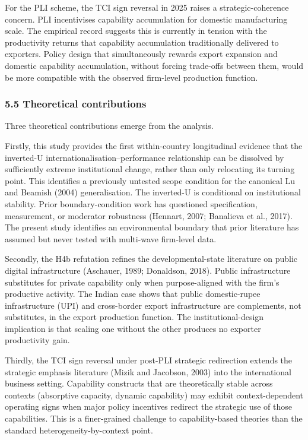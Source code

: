 \documentclass[
  12pt,a4paper]{article}
\begin{document}
For the PLI scheme, the TCI sign reversal in 2025 raises a
strategic-coherence concern. PLI incentivises capability accumulation
for domestic manufacturing scale. The empirical record suggests this is
currently in tension with the productivity returns that capability
accumulation traditionally delivered to exporters. Policy design that
simultaneously rewards export expansion and domestic capability
accumulation, without forcing trade-offs between them, would be more
compatible with the observed firm-level production function.

\hypertarget{theoretical-contributions}{%
\subsubsection{5.5 Theoretical
contributions}\label{theoretical-contributions}}

Three theoretical contributions emerge from the analysis.

Firstly, this study provides the first within-country longitudinal
evidence that the inverted-U internationalisation--performance
relationship can be dissolved by sufficiently extreme institutional
change, rather than only relocating its turning point. This identifies a
previously untested scope condition for the canonical Lu and Beamish
(2004) generalisation. The inverted-U is conditional on institutional
stability. Prior boundary-condition work has questioned specification,
measurement, or moderator robustness (Hennart, 2007; Banalieva et al.,
2017). The present study identifies an environmental boundary that prior
literature has assumed but never tested with multi-wave firm-level data.

Secondly, the H4b refutation refines the developmental-state literature
on public digital infrastructure (Aschauer, 1989; Donaldson, 2018).
Public infrastructure substitutes for private capability only when
purpose-aligned with the firm's productive activity. The Indian case
shows that public domestic-rupee infrastructure (UPI) and cross-border
export infrastructure are complements, not substitutes, in the export
production function. The institutional-design implication is that
scaling one without the other produces no exporter productivity gain.

Thirdly, the TCI sign reversal under post-PLI strategic redirection
extends the strategic emphasis literature (Mizik and Jacobson, 2003)
into the international business setting. Capability constructs that are
theoretically stable across contexts (absorptive capacity, dynamic
capability) may exhibit context-dependent operating signs when major
policy incentives redirect the strategic use of those capabilities. This
is a finer-grained challenge to capability-based theories than the
standard heterogeneity-by-context point.
\end{document}

